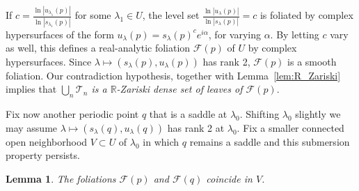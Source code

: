 \documentclass[11pt, oneside]{amsart}
\newcommand{\R}{\mathbb{R}}
\newcommand{\abs}[1]{\left\vert#1\right\vert}
\newcommand{\la}{\lambda}
\newcommand{\lo}{{\lambda_0}}
\newtheorem{lem}[prop] {Lemma}
\theoremstyle{remark}
\theoremstyle{definition}
\theoremstyle{theorem}
\newcommand{\commentaire}[1]{}
\begin{document}
\commentaire{Correction for Minor comment \#12} 
If  $c= \frac{\ln\abs{u_{\la_1}(p)}}{\ln\abs{s_{\la_1}(p)}}$ for some $\lambda_1 \in U$, 
the level set 
$\frac{\ln\abs{u_\la(p)}}{\ln\abs{s_\la(p)}} = c$ is 
foliated by complex hypersurfaces of the form  $u_\la(p) = s_\la(p)^c e^{i\alpha}$,  for varying $\alpha$.
By letting $c$ vary as well,  
this defines a real-analytic foliation $\mathcal F(p)$ of $U$ by complex hypersurfaces. 
Since $\lambda \mapsto (s_\la(p), u_\la(p))$ has rank 2, $\mathcal F(p)$ is a smooth foliation. 
 Our contradiction hypothesis, together with Lemma~\ref{lem:R_Zariski}
  implies that  \emph{$\bigcup_n \mathcal T_n$ is a $\R$-Zariski dense 
set of leaves of $\mathcal F(p)$}.  

Fix now another   periodic point $q$ that is a saddle at $\lo$. 
Shifting $\lo$ slightly we may assume $\lambda \mapsto (s_\la(q), u_\la(q))$ has rank 2  at $\lo$. 
Fix a  smaller  connected open neighborhood  $V\subset U$ of $\lo$ in which $q$ remains
 a saddle and this submersion property persists. 

\begin{lem}
The foliations $\mathcal F(p)$ and $\mathcal F(q)$ coincide in $V$. 
\end{lem}
\end{document}
